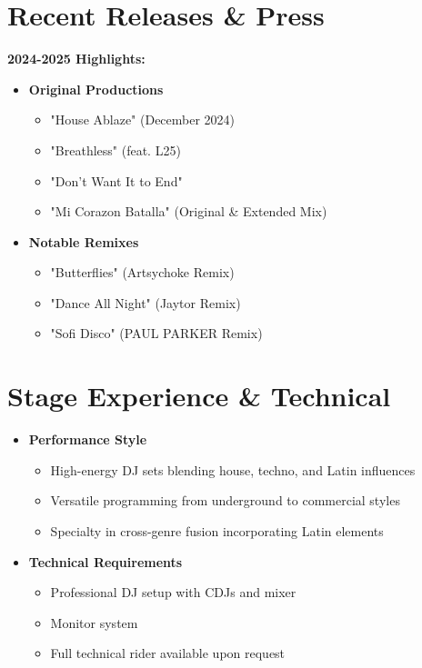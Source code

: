 \documentclass[11pt]{article}
\begin{document}
\section{ Recent Releases \& Press}
\textbf{2024-2025 Highlights:}
\begin{itemize}[leftmargin=*]
\item \textbf{Original Productions}
    \begin{itemize}
    \item "House Ablaze" (December 2024)
    \item "Breathless" (feat. L25)
    \item "Don't Want It to End"
    \item "Mi Corazon Batalla" (Original \& Extended Mix)
    \end{itemize}
\item \textbf{Notable Remixes}
    \begin{itemize}
    \item "Butterflies" (Artsychoke Remix)
    \item "Dance All Night" (Jaytor Remix)
    \item "Sofi Disco" (PAUL PARKER Remix)
    \end{itemize}
\end{itemize}

\section{ Stage Experience \& Technical}
\begin{itemize}[leftmargin=*]
\item \textbf{Performance Style}
    \begin{itemize}
    \item High-energy DJ sets blending house, techno, and Latin influences
    \item Versatile programming from underground to commercial styles
    \item Specialty in cross-genre fusion incorporating Latin elements
    \end{itemize}
\item \textbf{Technical Requirements}
    \begin{itemize}
    \item Professional DJ setup with CDJs and mixer
    \item Monitor system
    \item Full technical rider available upon request
    \end{itemize}
\end{itemize}
\end{document}
